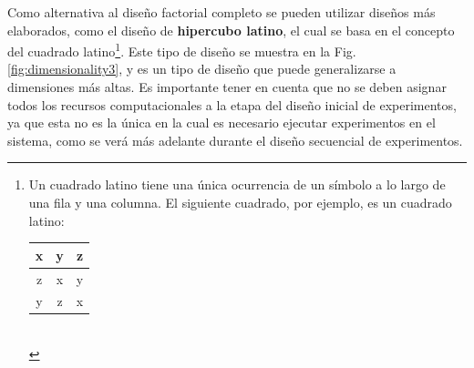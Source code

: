 Como alternativa al diseño factorial completo se pueden utilizar diseños más elaborados, como el diseño de \textbf{hipercubo latino}, el cual se basa en el concepto del cuadrado latino\footnote{Un cuadrado latino tiene una única ocurrencia de un símbolo a lo largo de una fila y una columna. El siguiente cuadrado, por ejemplo, es un cuadrado latino:\\

\centering
\begin{tabular}{|c|c|c|}
\hline
x & y & z\\ \hline
z & x & y\\ \hline
y & z & x\\ \hline
\end{tabular}\\
}. Este tipo de diseño se muestra en la Fig. \ref{fig:dimensionality3}, y es un tipo de diseño que puede generalizarse a dimensiones más altas. Es importante tener en cuenta que no se deben asignar todos los recursos computacionales a la etapa del diseño inicial de experimentos, ya que esta no es la única en la cual es necesario ejecutar experimentos en el sistema, como se verá más adelante durante el diseño secuencial de experimentos.

